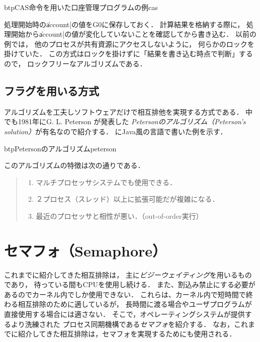 \begin{itemize}
  \begin{myfig}{btp}{CAS命令を用いた口座管理プログラムの例}{cas}
    
  \end{myfig}

  処理開始時の\|account|の値をG0に保存しておく．
  計算結果を格納する際に，
  処理開始から\|account|の値が変化していないことを確認してから書き込む．
  以前の例では，
  他のプロセスが共有資源にアクセスしないように，
  何らかのロックを掛けていた．
  この方式はロックを掛けずに「結果を書き込む時点で判断」するので，
  ロックフリーなアルゴリズムである．
\end{itemize}

\subsection{フラグを用いる方式}
アルゴリズムを工夫しソフトウェアだけで相互排他を実現する方式である．
中でも1981年にG. L. Peterson が発表した
\emph{Petersonのアルゴリズム（Peterson's solution）}が有名なので紹介する．
にJava風の言語で書いた例を示す．

\begin{myfig}{btp}{Petersonのアルゴリズム}{peterson}
  
\end{myfig}

このアルゴリズムの特徴は次の通りである．

\begin{quote}
  \begin{enumerate}
  \item マルチプロセッサシステムでも使用できる．
  \item ２プロセス（スレッド）以上に拡張可能だが複雑になる．
  \item 最近のプロセッサと相性が悪い．（out-of-order実行）
  \end{enumerate}
\end{quote}

\section{セマフォ（Semaphore）}
これまでに紹介してきた相互排除は，
主に\emph{ビジーウェイティング}を用いるものであり，
待っている間もCPUを使用し続ける．
また、割込み禁止にする必要があるのでカーネル内でしか使用できない．
これらは、カーネル内で短時間で終わる相互排除のために適しているが，
長時間に渡る場合やユーザプログラムが直接使用する場合には適さない．
そこで，オペレーティングシステムが提供するより洗練された
プロセス同期機構である\emph{セマフォ}を紹介する．
なお，これまでに紹介してきた相互排除は，セマフォを実現するためにも使用される．

